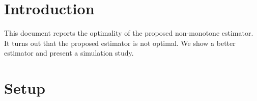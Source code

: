 \documentclass[12pt]{article}
\begin{document}
\rhead{\today}

\section*{Introduction}

This document reports the optimality of the proposed non-monotone estimator.
It turns out that the proposed estimator is not optimal. We show a better
estimator and present a simulation study.

\section*{Setup}
\end{document}
